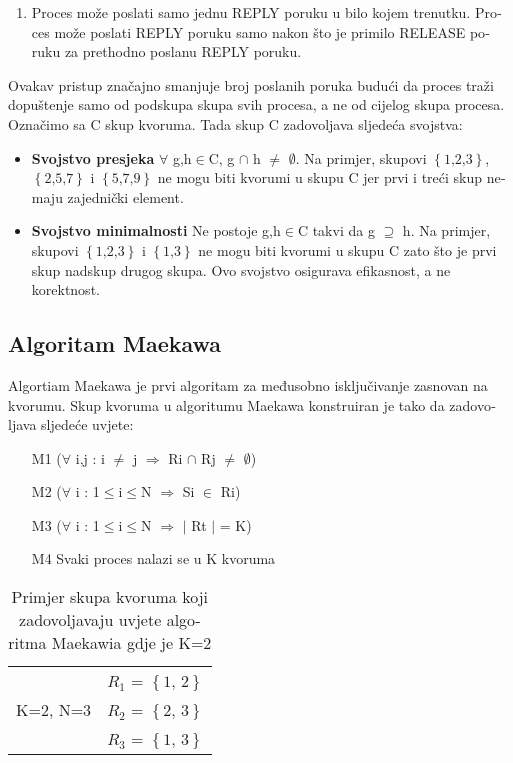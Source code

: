 \documentclass[12pt]{rectors}
\begin{document}
\begin{otherlanguage}{croatian}
\begin{enumerate}
	\item {Proces može poslati samo jednu REPLY poruku u bilo kojem trenutku. Proces može poslati REPLY poruku samo nakon što je primilo RELEASE poruku za prethodno poslanu REPLY poruku. }
\end{enumerate}

Ovakav pristup značajno smanjuje broj poslanih poruka budući da proces traži dopuštenje samo od podskupa skupa svih procesa, a ne od cijelog skupa procesa.
\newline
\newline
Označimo sa C skup kvoruma. Tada skup C zadovoljava sljedeća svojstva:
\begin{itemize}
	\item \textbf{Svojstvo presjeka} $\forall$ g,h$\in${C}, g $\cap$ h $\neq$ $\emptyset$. Na primjer, skupovi $\left\{\text{1,2,3}\right\}$, $\left\{\text{2,5,7}\right\}$ i $\left\{\text{5,7,9}\right\}$ ne mogu biti kvorumi u skupu C jer prvi i treći skup nemaju zajednički element.
	\item \textbf{Svojstvo minimalnosti} Ne postoje g,h$\in${C} takvi da g $\supseteq$ h. Na primjer, skupovi $\left\{\text{1,2,3}\right\}$ i $\left\{\text{1,3}\right\}$ ne mogu biti kvorumi u skupu C zato što je prvi skup nadskup drugog skupa.
	Ovo svojstvo osigurava efikasnost, a ne korektnost.
\end{itemize}


\subsection{Algoritam Maekawa}
Algortiam Maekawa je prvi algoritam za međusobno isključivanje zasnovan na kvorumu. Skup kvoruma u algoritumu Maekawa konstruiran je tako da zadovoljava sljedeće uvjete: 
\begin{itemize}
	\item [M1] ($\forall$ i,j : i $\neq$ j $\Rightarrow$ Ri $\cap$ Rj $\neq$ $\emptyset$)
	\item [M2] ($\forall$ i : 1$\leq$i$\leq$N $\Rightarrow$ Si $\in$ Ri)
	\item [M3] ($\forall$ i : 1$\leq$i$\leq$N $\Rightarrow$ $\mid$ Rt $\mid$ = K)
	\item [M4] Svaki proces nalazi se u K kvoruma
\end{itemize}

\begin{table}[H]
	\centering
	\caption{Primjer skupa kvoruma koji zadovoljavaju uvjete algoritma Maekawia gdje je K=2}
	\label{my-label}
	\begin{tabular}{|l|l|}
		\hline
		& $R_1$ = $\left\{\text{1, 2}\right\}$  \\
		K=2, N=3    & $R_2$ = $\left\{\text{2, 3}\right\}$ \\ 
		& $R_3$ = $\left\{\text{1, 3}\right\}$ \\ \hline
	\end{tabular}
\end{table}


\end{otherlanguage}
\end{document}

